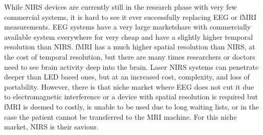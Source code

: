 While NIRS devices are currently still in the research phase with very few commercial systems, it is hard to see it ever successfully replacing EEG or fMRI measurements. EEG systems have a very large marketshare with commercially available system everywhere for very cheap and have a slightly higher temporal resolution than NIRS. fMRI has a much higher spatial resolution than NIRS, at the cost of temporal resolution, but there are many times researchers or doctors need to see brain activity deep into the brain. Laser NIRS systems can penetrate deeper than LED based ones, but at an increased cost, complexity, and loss of portability. However, there is that niche market where EEG does not cut it due to electromagnetic interference or a device with spatial resolution is required but fMRI is deemed to costly, is unable to be used due to long waiting lists, or in the case the patient cannot be transferred to the MRI machine. For this niche market, NIRS is their saviour. 